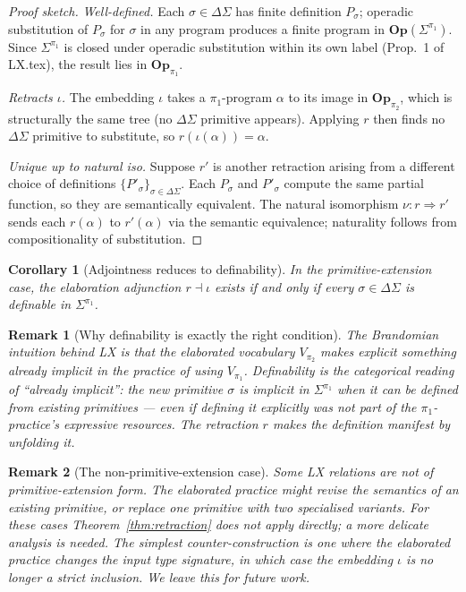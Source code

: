 \documentclass[11pt]{article}
\newtheorem{corollary}{Corollary}
\newtheorem{remark}{Remark}
\begin{document}
\begin{proof}[Proof sketch]
\emph{Well-defined.} Each $\sigma \in \Delta\Sigma$ has finite
definition $P_\sigma$; operadic substitution of $P_\sigma$ for
$\sigma$ in any program produces a finite program in
$\mathbf{Op}(\Sigma^{\pi_1})$. Since $\Sigma^{\pi_1}$ is closed under
operadic substitution within its own label (Prop.~1 of LX.tex),
the result lies in $\mathbf{Op}_{\pi_1}$.

\emph{Retracts $\iota$.} The embedding $\iota$ takes a
$\pi_1$-program $\alpha$ to its image in $\mathbf{Op}_{\pi_2}$, which
is structurally the same tree (no $\Delta\Sigma$ primitive
appears). Applying $r$ then finds no $\Delta\Sigma$ primitive to
substitute, so $r(\iota(\alpha)) = \alpha$.

\emph{Unique up to natural iso.} Suppose $r'$ is another retraction
arising from a different choice of definitions
$\{P'_\sigma\}_{\sigma \in \Delta\Sigma}$. Each $P_\sigma$ and
$P'_\sigma$ compute the same partial function, so they are
semantically equivalent. The natural isomorphism $\nu : r \Rightarrow
r'$ sends each $r(\alpha)$ to $r'(\alpha)$ via the semantic
equivalence; naturality follows from compositionality of substitution.
\end{proof}

\begin{corollary}[Adjointness reduces to definability]
In the primitive-extension case, the elaboration adjunction $r \dashv \iota$
exists if and only if every $\sigma \in \Delta\Sigma$ is definable in
$\Sigma^{\pi_1}$.
\end{corollary}

\begin{remark}[Why definability is exactly the right condition]
The Brandomian intuition behind LX is that the elaborated vocabulary
$V_{\pi_2}$ makes \emph{explicit} something already implicit in the
practice of using $V_{\pi_1}$. Definability is the categorical
reading of ``already implicit'': the new primitive $\sigma$ is
implicit in $\Sigma^{\pi_1}$ when it can be defined from existing
primitives — even if defining it explicitly was not part of the
$\pi_1$-practice's expressive resources. The retraction $r$ makes
the definition manifest by unfolding it.
\end{remark}

\begin{remark}[The non-primitive-extension case]
Some LX relations are not of primitive-extension form. The
elaborated practice might revise the semantics of an existing
primitive, or replace one primitive with two specialised variants.
For these cases Theorem~\ref{thm:retraction} does not apply
directly; a more delicate analysis is needed. The simplest
counter-construction is one where the elaborated practice changes
the input type signature, in which case the embedding $\iota$ is no
longer a strict inclusion. We leave this for future work.
\end{remark}
\end{document}
